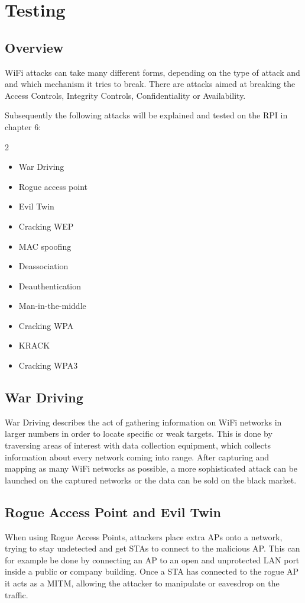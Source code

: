 \chapter{Testing}\label{ch:testing}
\section{Overview}
WiFi attacks can take many different forms, depending on the type of attack and and which mechanism it tries to break.
There are attacks aimed at breaking the Access Controls, Integrity Controls, Confidentiality or Availability.

Subsequently the following attacks will be explained and tested on the RPI in chapter 6:

\begin{multicols}{2}
    \begin{itemize}
        \item War Driving
        \item Rogue access point
        \item Evil Twin
        \item Cracking WEP
        \item MAC spoofing
        \item Deassociation
        \item Deauthentication
        \item Man-in-the-middle
        \item Cracking WPA
        \item KRACK
        \item Cracking WPA3
    \end{itemize}
\end{multicols}

\section{War Driving}
War Driving describes the act of gathering information on WiFi networks in larger numbers in order to locate specific or weak targets.
This is done by traversing areas of interest with data collection equipment, which collects information about every network coming into range.
After capturing and mapping as many WiFi networks as possible, a more sophisticated attack can be launched on the captured networks or the data can be sold on the black market. \cite{Oriyano_2017}

\section{Rogue Access Point and Evil Twin}
When using Rogue Access Points, attackers place extra APs onto a network, trying to stay undetected and get STAs to connect to the malicious AP.
This can for example be done by connecting an AP to an open and unprotected LAN port inside a public or company building.
Once a STA has connected to the rogue AP it acts as a MITM, allowing the attacker to manipulate or eavesdrop on the traffic.

